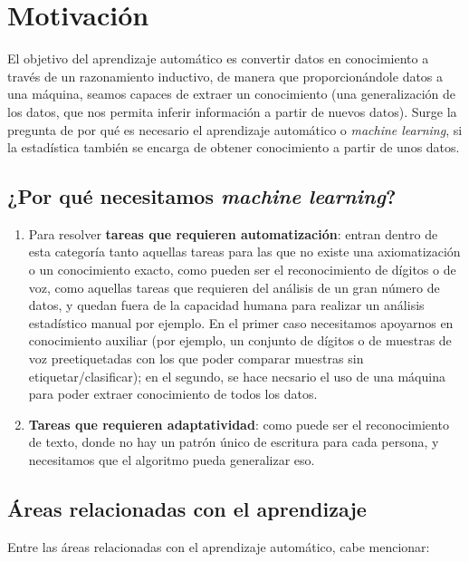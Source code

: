 

\section{Motivación}

El objetivo del aprendizaje automático es convertir datos en conocimiento a través de un razonamiento inductivo, de manera que
proporcionándole datos a una máquina, seamos capaces de extraer un conocimiento (una generalización de los datos, que nos permita
inferir información a partir de nuevos datos). Surge la pregunta de por qué es necesario el aprendizaje automático o 
\textit{machine learning}, si la estadística también se encarga de obtener conocimiento a partir de unos datos.

\subsection{¿Por qué necesitamos \textit{machine learning}?}
\begin{enumerate}[i]
 \item Para resolver \textbf{tareas que requieren automatización}: entran dentro de esta categoría tanto aquellas tareas para
 las que no existe una axiomatización o un conocimiento exacto, como pueden ser el reconocimiento de dígitos o de voz, como 
 aquellas tareas que requieren del análisis de un gran número de datos, y quedan fuera de la capacidad humana para realizar
 un análisis estadístico manual por ejemplo. En el primer caso necesitamos apoyarnos en conocimiento auxiliar (por ejemplo, 
 un conjunto de dígitos o de muestras de voz preetiquetadas con los que poder comparar muestras sin etiquetar/clasificar); 
 en el segundo, se hace necsario el uso de una máquina para poder extraer conocimiento de todos los datos.
 
 \item \textbf{Tareas que requieren adaptatividad}: como puede ser el reconocimiento de texto, donde no hay un patrón único de
 escritura para cada persona, y necesitamos que el algoritmo pueda generalizar eso.
\end{enumerate}

\subsection{Áreas relacionadas con el aprendizaje}
Entre las áreas relacionadas con el aprendizaje automático, cabe mencionar:

